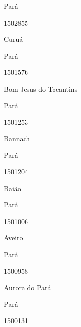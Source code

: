 \documentclass[
  letterpaper,
]{report}
\begin{document}
\n    

\n      

Pará

\n      

1502855

\n      

Curuá

\n    

\n    

\n      

Pará

\n      

1501576

\n      

Bom Jesus do Tocantins

\n    

\n    

\n      

Pará

\n      

1501253

\n      

Bannach

\n    

\n    

\n      

Pará

\n      

1501204

\n      

Baião

\n    

\n    

\n      

Pará

\n      

1501006

\n      

Aveiro

\n    

\n    

\n      

Pará

\n      

1500958

\n      

Aurora do Pará

\n    

\n    

\n      

Pará

\n      

1500131
\end{document}
